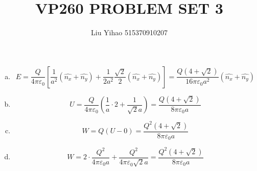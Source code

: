 \documentclass{article}
\title{VP260 PROBLEM SET 3}
\author{Liu Yihao 515370910207}
\date{}
\begin{document}
\maketitle

\section{}
\begin{enumerate}[(a)]
\item
$$E=\frac{Q}{4\pi\varepsilon_0}\left[\frac{1}{a^2}(\hat{n_x}+\hat{n_y})+\frac{1}{2a^2}\frac{\sqrt{2}}{2}(\hat{n_x}+\hat{n_y})\right]
=\frac{Q(4+\sqrt{2})}{16\pi\varepsilon_0a^2}(\hat{n_x}+\hat{n_y})$$
\item
$$U=\frac{Q}{4\pi\varepsilon_0}\left(\frac{1}{a}\cdot2+\frac{1}{\sqrt{2}a}\right)=\frac{Q(4+\sqrt{2})}{8\pi\varepsilon_0a}$$
\item
$$W=Q(U-0)=\frac{Q^2(4+\sqrt{2})}{8\pi\varepsilon_0a}$$
\item
$$W=2\cdot\frac{Q^2}{4\pi\varepsilon_0a}+\frac{Q^2}{4\pi\varepsilon_0\sqrt{2}a}=\frac{Q^2(4+\sqrt{2})}{8\pi\varepsilon_0a}$$

\end{enumerate}
\end{document}
